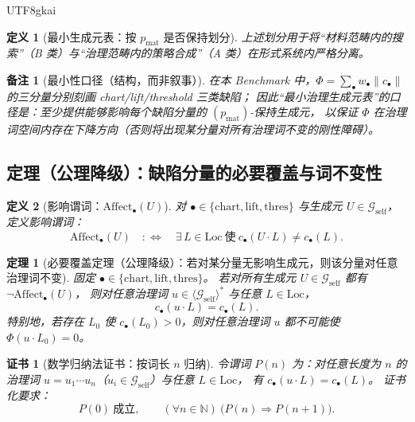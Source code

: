 \documentclass[12pt]{article}
\newtheorem{definition}{定义}[section]
\newtheorem{theorem}{定理}[section]
\newtheorem{remark}{备注}[section]
\newtheorem{certificate}{证书}[section]
\begin{document}
\begin{CJK*}{UTF8}{gkai}
\begin{definition}[最小生成元表：按 $p_{\mathrm{mat}}$ 是否保持划分]
上述划分用于将“材料范畴内的搜索”（B 类）与“治理范畴内的策略合成”（A 类）在形式系统内严格分离。
\end{definition}

\begin{remark}[最小性口径（结构，而非叙事）]
在本 Benchmark 中，$\Phi=\sum_{\bullet}w_{\bullet}\|c_{\bullet}\|$ 的三分量分别刻画 chart/lift/threshold 三类缺陷；
因此“最小治理生成元表”的口径是：\emph{至少提供能够影响每个缺陷分量的 $(p_{\mathrm{mat}})$-保持生成元}，
以保证 $\Phi$ 在治理词空间内存在下降方向（否则将出现某分量对所有治理词不变的刚性障碍）。
\end{remark}

\subsection{定理（公理降级）：缺陷分量的必要覆盖与词不变性}

\begin{definition}[影响谓词：$\mathrm{Affect}_{\bullet}(U)$]
\label{def:affect-predicate}
对 $\bullet\in\{\mathrm{chart},\mathrm{lift},\mathrm{thres}\}$ 与生成元 $U\in\mathcal{G}_{\mathrm{self}}$，
定义影响谓词：
\[
\mathrm{Affect}_{\bullet}(U)
\quad:\Longleftrightarrow\quad
\exists\,L\in\mathrm{Loc}\ \text{使}\ c_{\bullet}(U\cdot L)\neq c_{\bullet}(L).
\]
\end{definition}

\begin{theorem}[必要覆盖定理（公理降级）：若对某分量无影响生成元，则该分量对任意治理词不变]
\label{thm:component-invariance-under-words}
固定 $\bullet\in\{\mathrm{chart},\mathrm{lift},\mathrm{thres}\}$。
若对所有生成元 $U\in\mathcal{G}_{\mathrm{self}}$ 都有 $\neg\mathrm{Affect}_{\bullet}(U)$，
则对任意治理词 $u\in\langle \mathcal{G}_{\mathrm{self}}\rangle^\ast$ 与任意 $L\in\mathrm{Loc}$，
\[
c_{\bullet}(u\cdot L)=c_{\bullet}(L).
\]
特别地，若存在 $L_0$ 使 $c_{\bullet}(L_0)>0$，则对任意治理词 $u$ 都不可能使 $\Phi(u\cdot L_0)=0$。
\end{theorem}

\begin{certificate}[数学归纳法证书：按词长 $n$ 归纳]
\label{cert:component-invariance-induction}
令谓词 $P(n)$ 为：对任意长度为 $n$ 的治理词 $u=u_1\cdots u_n$（$u_i\in\mathcal{G}_{\mathrm{self}}$）与任意 $L\in\mathrm{Loc}$，
有 $c_{\bullet}(u\cdot L)=c_{\bullet}(L)$。
证书化要求：
\[
P(0)\ \text{成立},\qquad
(\forall n\in\mathbb{N})\ \bigl(P(n)\Rightarrow P(n+1)\bigr).
\]
\end{certificate}


\end{CJK*}
\end{document}

